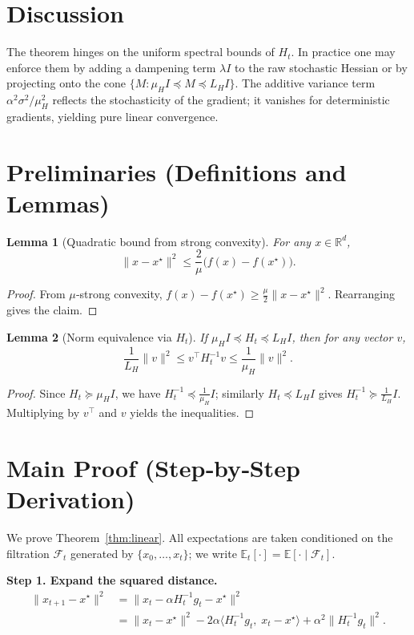 \documentclass{article}
\newtheorem{lemma}{Lemma}
\newcommand{\E}{\mathbb{E}}
\newcommand{\R}{\mathbb{R}}
\begin{document}
\section*{Discussion}
The theorem hinges on the uniform spectral bounds of $H_t$. In practice one may enforce them by adding a dampening term $\lambda I$ to the raw stochastic Hessian or by projecting onto the cone $\{M:\mu_H I\preceq M\preceq L_H I\}$. The additive variance term $\alpha^{2}\sigma^{2}/\mu_H^{2}$ reflects the stochasticity of the gradient; it vanishes for deterministic gradients, yielding pure linear convergence.

\newpage
\section*{Preliminaries (Definitions and Lemmas)}
\begin{lemma}[Quadratic bound from strong convexity]\label{lem:sc}
For any $x\in\R^{d}$,
\[
\|x-x^{\star}\|^{2}\le \frac{2}{\mu}\bigl(f(x)-f(x^{\star})\bigr).
\]
\end{lemma}
\begin{proof}
From $\mu$‑strong convexity,
$f(x)-f(x^{\star})\ge \frac{\mu}{2}\|x-x^{\star}\|^{2}$. Rearranging gives the claim. \hfill\qedsymbol
\end{proof}

\begin{lemma}[Norm equivalence via $H_t$]\label{lem:equiv}
If $\mu_H I \preceq H_t \preceq L_H I$, then for any vector $v$,
\[
\frac{1}{L_H}\|v\|^{2}\le v^{\top} H_t^{-1} v \le \frac{1}{\mu_H}\|v\|^{2}.
\]
\end{lemma}
\begin{proof}
Since $H_t\succeq \mu_H I$, we have $H_t^{-1}\preceq \frac{1}{\mu_H}I$; similarly $H_t\preceq L_H I$ gives $H_t^{-1}\succeq \frac{1}{L_H}I$. Multiplying by $v^{\top}$ and $v$ yields the inequalities. \hfill\qedsymbol
\end{proof}

\section*{Main Proof (Step‑by‑Step Derivation)}
We prove Theorem~\ref{thm:linear}. All expectations are taken conditioned on the filtration $\mathcal{F}_t$ generated by $\{x_0,\dots,x_t\}$; we write $\E_t[\cdot]=\E[\cdot\mid\mathcal{F}_t]$.

\noindent\textbf{Step 1. Expand the squared distance.}  
\[
\begin{aligned}
\|x_{t+1}-x^{\star}\|^{2}
&= \bigl\|x_t-\alpha H_t^{-1}g_t - x^{\star}\bigr\|^{2}                                      \\[0.2em] 
&= \|x_t-x^{\star}\|^{2}
      -2\alpha\langle H_t^{-1}g_t,\;x_t-x^{\star}\rangle
      +\alpha^{2}\|H_t^{-1}g_t\|^{2}.                                     \tag{4}
\end{aligned}
\]
\end{document}
